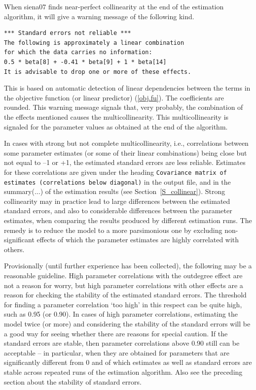 \documentclass[a4paper,fleqn,11pt]{article}
\newcommand{\+}{\, + \,}
\begin{document}
When \textsf{siena07} finds near-perfect collinearity at the end of the
estimation algorithm, it will give a warning message of the following kind.

\begin{verbatim}
*** Standard errors not reliable ***
The following is approximately a linear combination
for which the data carries no information:
0.5 * beta[8] + -0.41 * beta[9] + 1 * beta[14]
It is advisable to drop one or more of these effects.
\end{verbatim}

\noindent
This is based on automatic detection of linear dependencies
between the terms in the objective function (or linear predictor)
(\ref{obj.fu}). The coefficients are rounded.
This warning message signals that, very probably,
the combination of the effects mentioned causes the multicollinearity.
This multicollinearity is signaled for the parameter values as
obtained at the end of the algorithm.
\bigskip


In cases with strong but not complete multicollinearity,
i.e., correlations between some parameter estimates
(or some of their linear combinations) being close but not equal to --1 or +1,
the estimated standard errors are less reliable.
 Estimates for these correlations
are given under the heading
\texttt{Covariance matrix of estimates (correlations below diagonal)}
in the output file, and in the \textsf{summary(...)} of the estimation results
(see Section~\ref{S_collinear}).
Strong collinearity may in practice lead to large differences
between the estimated standard errors,
and also to considerable differences between the parameter estimates,
when comparing the results produced by different estimation runs.
The remedy is to reduce the model to a more parsimonious one
by excluding non-significant effects of which the parameter
estimates are highly correlated with others.

Provisionally (until further experience has been collected),
the following may be a reasonable guideline.
High parameter correlations with the outdegree effect are not a
reason for worry, but high parameter correlations with other effects are
a reason for checking the stability of the estimated standard errors. The
threshold for finding a parameter correlation `too high' in this respect
can be quite high, such as 0.95 (or 0.90).
In cases of high parameter correlations, estimating the model twice
(or more) and considering the stability of the standard errors will be
a good way for seeing whether there are reasons for special caution.
If the standard errors are stable, then parameter correlations above
0.90 still can be acceptable -- in particular, when they are obtained
for parameters that are significantly different from 0 and of which
estimates as well as standard errors are stable across repeated runs of
the estimation algorithm.
Also see the preceding section about the stability of standard errors.
\end{document}
